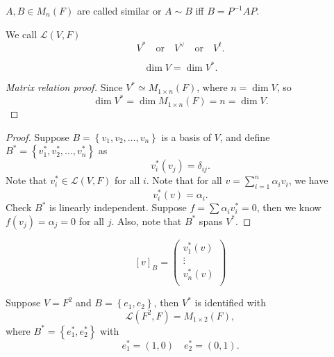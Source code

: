 \begin{definition}
    \(A, B \in M_n(F)\) are called similar or \(A \sim B\) iff \(B = P^{-1} A P \).    
\end{definition}

\begin{notation}
    We call \(\mathcal{L} (V, F)\)
    \[
        V^* \quad \text{or} \quad V^{\vee} \quad \text{or} \quad V^t.
    \] 
\end{notation}

\begin{theorem}
    \[
        \dim V = \dim V^*.
    \]
\end{theorem}
\begin{proof}[Matrix relation proof]
    Since \(V^* \simeq M_{1 \times n}(F)\), where \(n = \dim V\), so 
    \[
        \dim V^* = \dim M_{1 \times n}(F) = n = \dim V. 
    \]  
\end{proof}
\begin{proof}
    Suppose \(B = \left\{ v_1, v_2, \dots , v_n \right\} \) is a basis of \(V\), and define \(B^* = \left\{ v_1^*, v_2^*, \dots , v_n^* \right\} \) as 
    \[
        v_i^* \left( v_j \right) = \delta _{ij}. 
    \] Note that \(v_i^* \in \mathcal{L} (V, F)\) for all \(i\). Note that for all \(v = \sum_{i=1}^{n} \alpha _i v_i\), we have 
    \[
        v_i^* \left( v \right) = \alpha _i. 
    \] Check \(B^*\) is linearly independent. Suppose \(f = \sum \alpha _i v_i^* = 0 \), then we know \(f(v_j) = \alpha _j = 0\) for all \(j\). Also, note that \(B^*\) spans \(V^*\).       
\end{proof}

\begin{remark} \label{rmk: coordinate by dual basis}
    \[
        [v]_B = \begin{pmatrix}
             v_1^*(v) \\
              \vdots \\
              v_n^*(v) \\
        \end{pmatrix}
    \]
\end{remark}

\begin{eg}
    Suppose \(V = F^2\) and \(B = \left\{ e_1, e_2 \right\} \), then \(V^*\) is identified with 
    \[
        \mathcal{L} \left( F^2, F \right) = M_{1 \times 2}(F), 
    \] where \(B^* = \left\{ e_1^*, e_2^* \right\} \) with 
    \[
        e_1^* = (1, 0) \quad e_2^* = (0, 1).
    \] 
\end{eg}

